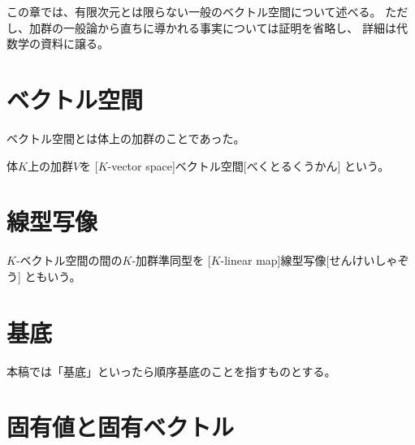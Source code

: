 \documentclass[report]{jlreq}
\begin{document}
この章では、有限次元とは限らない一般のベクトル空間について述べる。
ただし、加群の一般論から直ちに導かれる事実については証明を省略し、
詳細は代数学の資料に譲る。

%
\section{ベクトル空間}

ベクトル空間とは体上の加群のことであった。

\begin{definition}[ベクトル空間]
    体$K$上の加群$V$を
    [$K$-vector space]{ベクトル空間}[べくとるくうかん]
    という。
\end{definition}

%
\section{線型写像}

\begin{definition}[線型写像]
    $K$-ベクトル空間の間の$K$-加群準同型を
    [$K$-linear map]{線型写像}[せんけいしゃぞう]
    ともいう。
\end{definition}


%
\section{基底}

\begin{definition}[基底]
    \TODO{}
\end{definition}

\begin{remark}
    本稿では「基底」といったら順序基底のことを指すものとする。
\end{remark}

%
\section{固有値と固有ベクトル}
\end{document}
